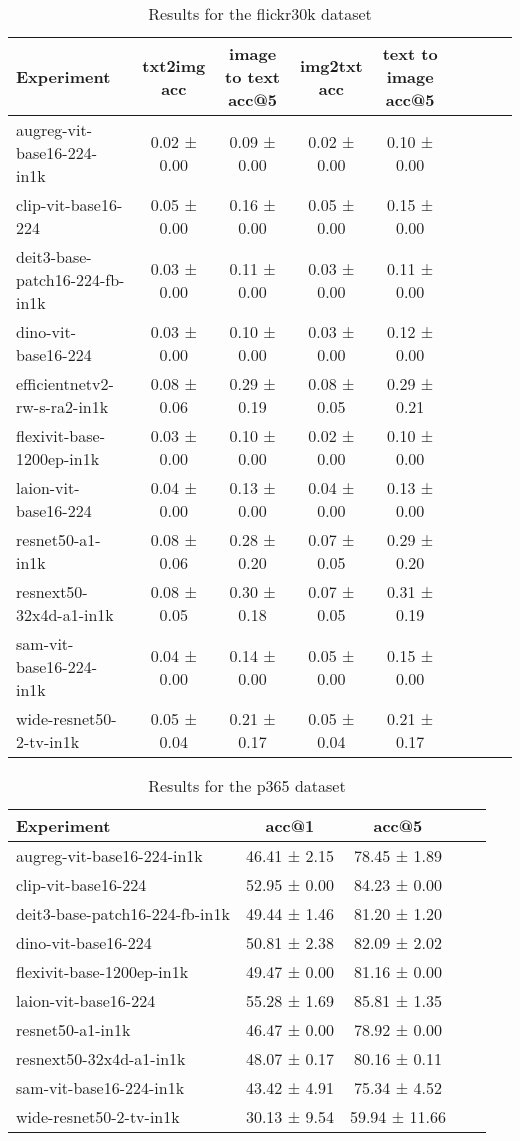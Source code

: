 \begin{table}[htbp]
\caption{Results for the flickr30k dataset}
\begin{tabular}{|l|c|c|c|c|c|c|c|c|}\hline
Experiment & txt2img acc & image to text acc@5 & img2txt acc & text to image acc@5\\
\hline
augreg-vit-base16-224-in1k & 0.02 ± 0.00 & 0.09 ± 0.00 & 0.02 ± 0.00 & 0.10 ± 0.00\\
\hline
clip-vit-base16-224 & 0.05 ± 0.00 & 0.16 ± 0.00 & 0.05 ± 0.00 & 0.15 ± 0.00\\
\hline
deit3-base-patch16-224-fb-in1k & 0.03 ± 0.00 & 0.11 ± 0.00 & 0.03 ± 0.00 & 0.11 ± 0.00\\
\hline
dino-vit-base16-224 & 0.03 ± 0.00 & 0.10 ± 0.00 & 0.03 ± 0.00 & 0.12 ± 0.00\\
\hline
efficientnetv2-rw-s-ra2-in1k & 0.08 ± 0.06 & 0.29 ± 0.19 & 0.08 ± 0.05 & 0.29 ± 0.21\\
\hline
flexivit-base-1200ep-in1k & 0.03 ± 0.00 & 0.10 ± 0.00 & 0.02 ± 0.00 & 0.10 ± 0.00\\
\hline
laion-vit-base16-224 & 0.04 ± 0.00 & 0.13 ± 0.00 & 0.04 ± 0.00 & 0.13 ± 0.00\\
\hline
resnet50-a1-in1k & 0.08 ± 0.06 & 0.28 ± 0.20 & 0.07 ± 0.05 & 0.29 ± 0.20\\
\hline
resnext50-32x4d-a1-in1k & 0.08 ± 0.05 & 0.30 ± 0.18 & 0.07 ± 0.05 & 0.31 ± 0.19\\
\hline
sam-vit-base16-224-in1k & 0.04 ± 0.00 & 0.14 ± 0.00 & 0.05 ± 0.00 & 0.15 ± 0.00\\
\hline
wide-resnet50-2-tv-in1k & 0.05 ± 0.04 & 0.21 ± 0.17 & 0.05 ± 0.04 & 0.21 ± 0.17\\
\hline
\end{tabular}
\end{table}

\begin{table}[htbp]
\caption{Results for the p365 dataset}
\begin{tabular}{|l|c|c|c|c|}\hline
Experiment & acc@1 & acc@5\\
\hline
augreg-vit-base16-224-in1k & 46.41 ± 2.15 & 78.45 ± 1.89\\
\hline
clip-vit-base16-224 & 52.95 ± 0.00 & 84.23 ± 0.00\\
\hline
deit3-base-patch16-224-fb-in1k & 49.44 ± 1.46 & 81.20 ± 1.20\\
\hline
dino-vit-base16-224 & 50.81 ± 2.38 & 82.09 ± 2.02\\
\hline
flexivit-base-1200ep-in1k & 49.47 ± 0.00 & 81.16 ± 0.00\\
\hline
laion-vit-base16-224 & 55.28 ± 1.69 & 85.81 ± 1.35\\
\hline
resnet50-a1-in1k & 46.47 ± 0.00 & 78.92 ± 0.00\\
\hline
resnext50-32x4d-a1-in1k & 48.07 ± 0.17 & 80.16 ± 0.11\\
\hline
sam-vit-base16-224-in1k & 43.42 ± 4.91 & 75.34 ± 4.52\\
\hline
wide-resnet50-2-tv-in1k & 30.13 ± 9.54 & 59.94 ± 11.66\\
\hline
\end{tabular}
\end{table}

